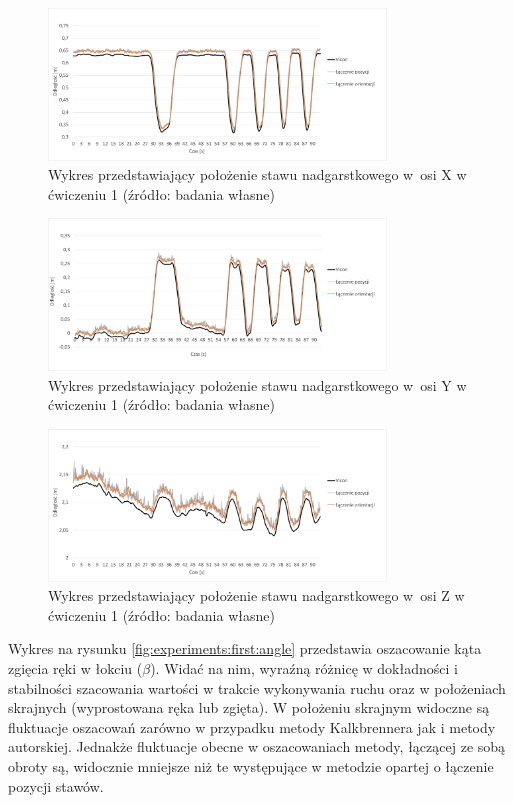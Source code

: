 	\begin{figure}[!htb]
		\centering
		\includegraphics[width=0.8\textwidth]{images/100/Slide4.png}
		\caption{Wykres przedstawiający położenie stawu nadgarstkowego w~osi X w ćwiczeniu 1 (źródło: badania własne)}
		\label{fig:experiments:first:wristX}
	\end{figure}
	\begin{figure}[!htb]
		\centering
		\includegraphics[width=0.8\textwidth]{images/100/Slide5.png}
		\caption{Wykres przedstawiający położenie stawu nadgarstkowego w~osi Y w ćwiczeniu 1 (źródło: badania własne)}
		\label{fig:experiments:first:wristY}
	\end{figure}
	\begin{figure}[!htb]
		\centering
		\includegraphics[width=0.8\textwidth]{images/100/Slide6.png}
		\caption{Wykres przedstawiający położenie stawu nadgarstkowego w~osi Z w ćwiczeniu 1 (źródło: badania własne)}
		\label{fig:experiments:first:wristZ}
	\end{figure}
			
Wykres na rysunku \ref{fig:experiments:first:angle} przedstawia oszacowanie kąta zgięcia ręki w łokciu ($\beta$). Widać na nim, wyraźną różnicę w dokładności i stabilności szacowania wartości w trakcie wykonywania ruchu oraz w położeniach skrajnych (wyprostowana ręka lub zgięta). W położeniu skrajnym widoczne są fluktuacje oszacowań zarówno w przypadku metody Kalkbrennera jak i metody autorskiej. Jednakże fluktuacje obecne w oszacowaniach metody, łączącej ze sobą obroty są, widocznie mniejsze niż te występujące w metodzie opartej o łączenie pozycji stawów.
			
